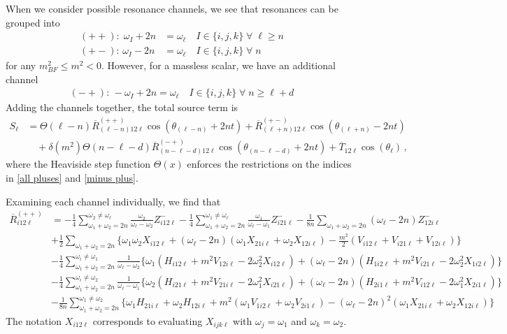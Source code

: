 \documentclass[letterpaper,11pt]{article}
\newcommand{\oi}{\omega_i}
\newcommand{\ol}{\omega_\ell}
\newcommand{\oone}{\omega_1}
\newcommand{\otwo}{\omega_2}
\begin{document}
When we consider possible resonance channels, we see that resonances can be grouped into
\begin{align}
\label{all pluses}
(++): \; \omega_I + 2n &= \omega_\ell \quad I \in \{i,j,k\} \; \forall \; \ell \geq n \\
(+-): \, \omega_I - 2n &=\omega_\ell \quad I \in \{i,j,k\} \; \forall \; n
\end{align}
for any $m^2_{BF} \leq m^2 < 0$. However, for a massless scalar, we have an additional channel
\begin{align}
\label{minus plus}
(-+): \, -\omega_I + 2n = \omega_\ell \quad I \in \{i,j,k\} \; \forall \; n \geq \ell + d
\end{align}
Adding the channels together, the total source term is
\begin{align}
S_\ell &=\Theta \left( \ell - n \right)  \overline{R}^{(++)}_{(\ell - n) 1 2 \ell} \cos \left( \theta_{(\ell - n)} + 2nt \right) + \overline{R}^{(+-)}_{(\ell + n) 1 2 \ell } \cos\left( \theta_{(\ell + n)} - 2nt \right) \nonumber \\
%
& \quad + \delta(m^2) \Theta\left( n - \ell - d \right) \overline{R}^{(-+)}_{(n - \ell - d) 1 2 \ell} \cos \left( \theta_{(n - \ell - d)} + 2nt \right) + \overline{T}_{12\ell} \cos \left( \theta_\ell \right) \, ,
\end{align}
where the Heaviside step function $\Theta(x)$ enforces the restrictions on the indices in \eqref{all pluses} and \eqref{minus plus}.

Examining each channel individually, we find that
\begin{align}
\label{R1}
\overline{R}^{(++)}_{i 1 2 \ell} &= - \frac{1}{4} \sum^{\otwo \neq \ol}_{\oone + \otwo = 2n} \frac{\otwo}{\ol - \otwo} Z^{-}_{i12\ell} - \frac{1}{4} \sum_{\oone+\otwo=2n}^{\oone \neq \ol} \frac{\oone}{\ol - \oone} Z^{-}_{i21\ell} - \frac{1}{8n} \sum_{\oone+\otwo = 2n}\!\!\!\! \left( \ol - 2n \right) Z^-_{12i\ell} \nonumber \\
%
& + \frac{1}{2} \sum_{\oone + \otwo = 2n} \Big\{ \oone\otwo X_{i12\ell} + \left( \ol - 2n \right)\left( \oone X_{21i\ell} + \otwo X_{12i\ell} \right) - \frac{m^2}{2} \left( V_{i12\ell} + V_{i21\ell} + V_{12i\ell} \right) \Big\} \nonumber \\
%
& - \frac{1}{4} \sum_{\oone + \otwo = 2n}^{\oi \neq \oone} \frac{1}{\ol - \otwo} \Big\{ \oone \left( H_{i12\ell} + m^2 V_{12i\ell} - 2 \otwo^2 X_{i12\ell} \right) + (\ol - 2n) \left( H_{1i2\ell} + m^2 V_{i21\ell} - 2\otwo^2 X_{1i2\ell} \right)\Big\} \nonumber \\
%
& - \frac{1}{4} \sum_{\oone + \otwo = 2n}^{\oi \neq \otwo} \frac{1}{\ol - \oone} \Big\{ \otwo \left( H_{i21\ell} + m^2 V_{21i\ell} - 2\oone^2 X_{i21\ell} \right) + (\ol - 2n) \left( H_{2i1\ell} + m^2 V_{i12\ell} - 2\oone^2 X_{2i1\ell} \right) \Big\} \nonumber \\
%
& - \frac{1}{8n} \sum_{\oone + \otwo = 2n}^{\oone \neq \otwo} \Big\{ \oone H_{21i\ell} + \otwo H_{12i\ell} + m^2 \left( \oone V_{1i2\ell} + \otwo V_{2i1\ell} \right) - \left( \ol - 2n \right)^2 \left(\oone X_{21i\ell} + \otwo X_{12i\ell} \right) \Big\}
\end{align}
The notation $X_{i12\ell}$ corresponds to evaluating $X_{ijk\ell}$ with $\omega_j = \oone$ and $\omega_k = \otwo$. 
\end{document}
